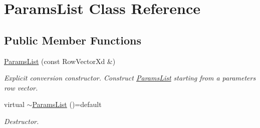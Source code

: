 \hypertarget{classParamsList}{\section{Params\-List Class Reference}
\label{classParamsList}
}
\subsection*{Public Member Functions}
\begin{DoxyCompactItemize}
\item 
\hyperlink{classParamsList_a339d3528a3c00f0263454ddecf5d4660}{Params\-List} (const Row\-Vector\-Xd \&)
\begin{DoxyCompactList}\small\item\em Explicit conversion constructor. Construct \hyperlink{classParamsList}{Params\-List} starting from a parameters row vector. \end{DoxyCompactList}\item 
\hypertarget{classParamsList_aa94a5114138c61fa1984f91c98bda4da}{virtual \hyperlink{classParamsList_aa94a5114138c61fa1984f91c98bda4da}{$\sim$\-Params\-List} ()=default}\label{classParamsList_aa94a5114138c61fa1984f91c98bda4da}

\begin{DoxyCompactList}\small\item\em Destructor. \end{DoxyCompactList}\end{DoxyCompactItemize}
